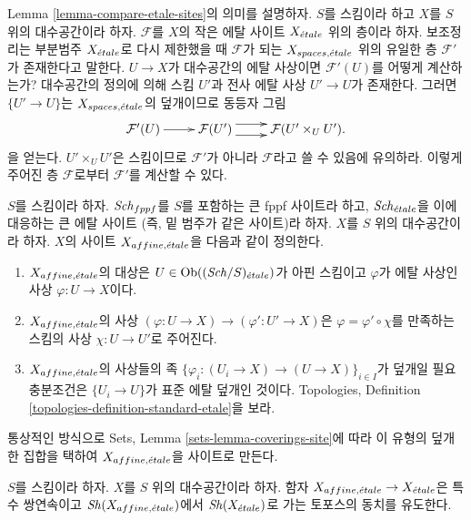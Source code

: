 \begin{remark}
\label{remark-explain-equivalence}
Lemma \ref{lemma-compare-etale-sites}의 의미를 설명하자.
$S$를 스킴이라 하고 $X$를 $S$ 위의 대수공간이라 하자.
$\mathcal{F}$를 $X$의 작은 에탈 사이트 $X_{\acute{e}tale}$ 위의 층이라 하자.
보조정리는 부분범주 $X_{\acute{e}tale}$로 다시 제한했을 때
$\mathcal{F}$가 되는 $X_{spaces, {\acute{e}tale}}$ 위의 유일한 층
$\mathcal{F}'$가 존재한다고 말한다. $U \to X$가 대수공간의
에탈 사상이면 $\mathcal{F}'(U)$를 어떻게 계산하는가?
대수공간의 정의에 의해 스킴 $U'$과 전사 에탈 사상
$U' \to U$가 존재한다. 그러면 $\{U' \to U\}$는
$X_{spaces, {\acute{e}tale}}$의 덮개이므로 동등자 그림
$$
\xymatrix{
\mathcal{F}'(U) \ar[r] &
\mathcal{F}(U') \ar@<1ex>[r] \ar@<-1ex>[r] &
\mathcal{F}(U' \times_U U').
}
$$
을 얻는다. $U' \times_U U'$은 스킴이므로
$\mathcal{F}'$가 아니라 $\mathcal{F}$라고 쓸 수 있음에 유의하라.
이렇게 주어진 층 $\mathcal{F}$로부터 $\mathcal{F}'$를 계산할 수 있다.
\end{remark}

\begin{definition}
\label{definition-affine-etale-site}
$S$를 스킴이라 하자.
$\mathit{Sch}_{fppf}$를 $S$를 포함하는 큰 fppf 사이트라 하고,
$\mathit{Sch}_{\acute{e}tale}$을 이에 대응하는 큰 에탈 사이트
(즉, 밑 범주가 같은 사이트)라 하자.
$X$를 $S$ 위의 대수공간이라 하자.
$X$의 사이트 {\it $X_{affine, {\acute{e}tale}}$}을 다음과 같이 정의한다.
\begin{enumerate}
\item $X_{affine, {\acute{e}tale}}$의 대상은
$U \in \mathop{\mathrm{Ob}}\nolimits((\mathit{Sch}/S)_{\acute{e}tale})$가 아핀 스킴이고
$\varphi$가 에탈 사상인 사상 $\varphi : U \to X$이다.
\item $X_{affine, {\acute{e}tale}}$의 사상
$(\varphi : U \to X) \to (\varphi' : U' \to X)$은
$\varphi = \varphi' \circ \chi$를 만족하는 스킴의 사상
$\chi : U \to U'$로 주어진다.
\item $X_{affine, {\acute{e}tale}}$의 사상들의 족
$\{\varphi_i : (U_i \to X) \to (U \to X)\}_{i \in I}$가
덮개일 필요충분조건은 $\{U_i \to U\}$가 표준 에탈 덮개인 것이다.
Topologies, Definition \ref{topologies-definition-standard-etale}을 보라.
\end{enumerate}
통상적인 방식으로 Sets, Lemma \ref{sets-lemma-coverings-site}에 따라
이 유형의 덮개 한 집합을 택하여 $X_{affine, {\acute{e}tale}}$을 사이트로 만든다.
\end{definition}

\begin{lemma}
\label{lemma-alternative}
$S$를 스킴이라 하자. $X$를 $S$ 위의 대수공간이라 하자.
함자 $X_{affine, {\acute{e}tale}} \to X_{\acute{e}tale}$은 특수 쌍연속이고
$\mathop{\mathit{Sh}}\nolimits(X_{affine, {\acute{e}tale}})$에서 $\mathop{\mathit{Sh}}\nolimits(X_{\acute{e}tale})$로 가는
토포스의 동치를 유도한다.
\end{lemma}

